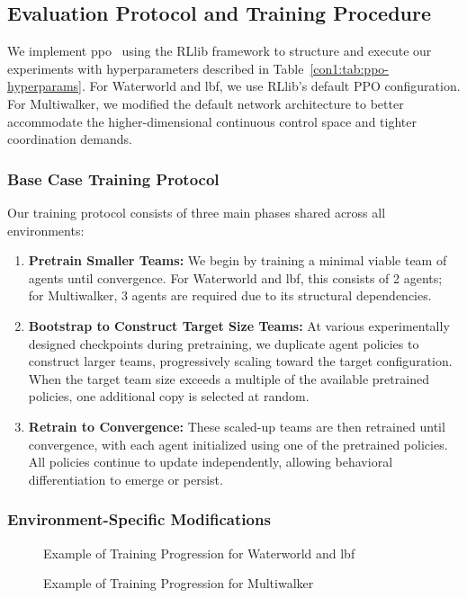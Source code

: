 \documentclass{article}
\begin{document}
\subsection{Evaluation Protocol and Training Procedure}

We implement \gls{ppo}~\cite{schulman2017} using the RLlib 
framework to structure and execute our experiments with hyperparameters described in
Table~\cref{con1:tab:ppo-hyperparams}. For Waterworld and \gls{lbf}, 
we use RLlib's default PPO configuration. For Multiwalker, we modified the default 
network architecture to better accommodate the higher-dimensional continuous control space and 
tighter coordination demands.

\subsubsection{Base Case Training Protocol}

Our training protocol consists of three main phases shared across all environments:
\begin{enumerate}
    \item \textbf{Pretrain Smaller Teams:} We begin by training a minimal viable team of 
        agents until convergence. For Waterworld and \gls{lbf}, this consists of 2 agents; 
        for Multiwalker, 3 agents are required due to its structural dependencies.
    \item \textbf{Bootstrap to Construct Target Size Teams:} At various experimentally 
        designed checkpoints during pretraining, we duplicate agent policies to construct 
        larger teams, progressively scaling toward the target configuration. 
        When the target team size exceeds a multiple of the available pretrained policies, 
        one additional copy is selected at random.
    \item \textbf{Retrain to Convergence:} These scaled-up teams are then retrained until 
        convergence, with each agent initialized using one of the pretrained policies. 
        All policies continue to update independently, allowing behavioral differentiation to 
        emerge or persist.
\end{enumerate}

\subsubsection{Environment-Specific Modifications}

\begin{figure}[!ht]
    \centering 
    \caption{Example of Training Progression for Waterworld and \gls{lbf}}
    \label{con1:fig:training_1}
\end{figure}
\begin{figure}[!ht]
    \centering
    \caption{Example of Training Progression for Multiwalker}
    \label{con1:fig:training_2}
\end{figure}
\end{document}
